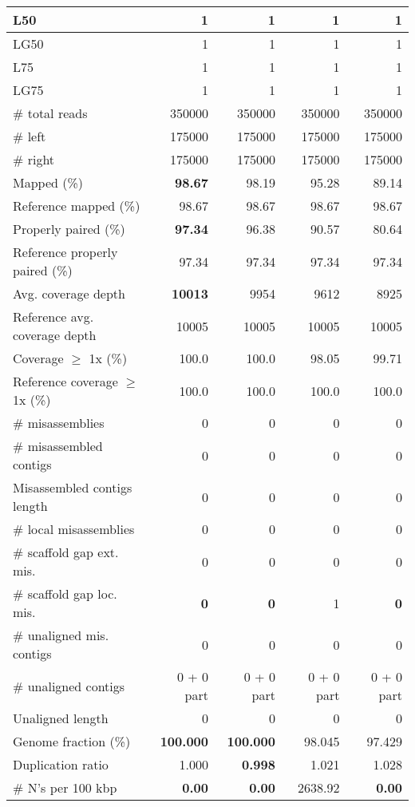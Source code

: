 \documentclass[12pt,a4paper]{article}
\begin{document}
\begin{table}[ht]
\begin{center}
\begin{tabular}{|l*{4}{|r}|}
L50 & 1 & 1 & 1 & 1 \\ \hline
LG50 & 1 & 1 & 1 & 1 \\ \hline
L75 & 1 & 1 & 1 & 1 \\ \hline
LG75 & 1 & 1 & 1 & 1 \\ \hline
\# total reads & 350000 & 350000 & 350000 & 350000 \\ \hline
\# left & 175000 & 175000 & 175000 & 175000 \\ \hline
\# right & 175000 & 175000 & 175000 & 175000 \\ \hline
Mapped (\%) & {\bf 98.67} & 98.19 & 95.28 & 89.14 \\ \hline
Reference mapped (\%) & 98.67 & 98.67 & 98.67 & 98.67 \\ \hline
Properly paired (\%) & {\bf 97.34} & 96.38 & 90.57 & 80.64 \\ \hline
Reference properly paired (\%) & 97.34 & 97.34 & 97.34 & 97.34 \\ \hline
Avg. coverage depth & {\bf 10013} & 9954 & 9612 & 8925 \\ \hline
Reference avg. coverage depth & 10005 & 10005 & 10005 & 10005 \\ \hline
Coverage $\geq$ 1x (\%) & 100.0 & 100.0 & 98.05 & 99.71 \\ \hline
Reference coverage $\geq$ 1x (\%) & 100.0 & 100.0 & 100.0 & 100.0 \\ \hline
\# misassemblies & 0 & 0 & 0 & 0 \\ \hline
\# misassembled contigs & 0 & 0 & 0 & 0 \\ \hline
Misassembled contigs length & 0 & 0 & 0 & 0 \\ \hline
\# local misassemblies & 0 & 0 & 0 & 0 \\ \hline
\# scaffold gap ext. mis. & 0 & 0 & 0 & 0 \\ \hline
\# scaffold gap loc. mis. & {\bf 0} & {\bf 0} & 1 & {\bf 0} \\ \hline
\# unaligned mis. contigs & 0 & 0 & 0 & 0 \\ \hline
\# unaligned contigs & 0 + 0 part & 0 + 0 part & 0 + 0 part & 0 + 0 part \\ \hline
Unaligned length & 0 & 0 & 0 & 0 \\ \hline
Genome fraction (\%) & {\bf 100.000} & {\bf 100.000} & 98.045 & 97.429 \\ \hline
Duplication ratio & 1.000 & {\bf 0.998} & 1.021 & 1.028 \\ \hline
\# N's per 100 kbp & {\bf 0.00} & {\bf 0.00} & 2638.92 & {\bf 0.00} \\ \hline

\end{tabular}
\end{center}
\end{table}
\end{document}
